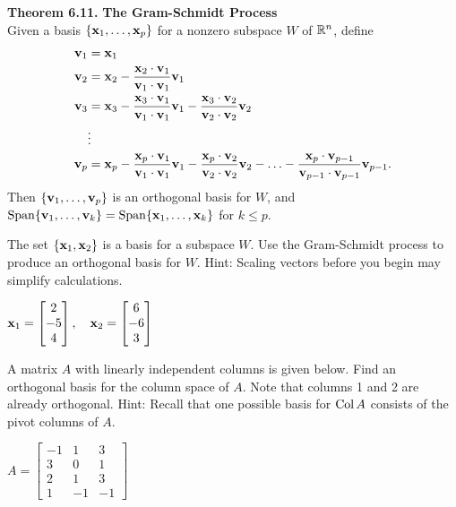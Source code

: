 \begin{boxthm}
	\textbf{Theorem 6.11.}
	\textbf{The Gram-Schmidt Process} \\
	Given a basis $\vectset[x]{1}{p}$ for a nonzero subspace $W$ of $\R^n$, define
	\vspace{-1ex}
	\begin{align*}
	\vect{v}_1 &= \vect{x}_1 \\
	\vect{v}_2 &= \vect{x}_2 - \frac{\vect{x}_2\cdot\vect{v}_1}{\vect{v}_1\cdot\vect{v}_1}\vect{v}_1 \\
	\vect{v}_3 &= \vect{x}_3 - \frac{\vect{x}_3\cdot\vect{v}_1}{\vect{v}_1\cdot\vect{v}_1}\vect{v}_1 - \frac{\vect{x}_3\cdot\vect{v}_2}{\vect{v}_2\cdot\vect{v}_2}\vect{v}_2 \\
	&\vdots \\
	\vect{v}_p &= \vect{x}_p - \frac{\vect{x}_p\cdot\vect{v}_1}{\vect{v}_1\cdot\vect{v}_1}\vect{v}_1 - \frac{\vect{x}_p\cdot\vect{v}_2}{\vect{v}_2\cdot\vect{v}_2}\vect{v}_2 - \ldots -  \frac{\vect{x}_p\cdot\vect{v}_{p-1}}{\vect{v}_{p-1}\cdot\vect{v}_{p-1}}\vect{v}_{p-1}.
	\end{align*}
	Then $\vectsetvp$ is an orthogonal basis for $W$, and $\Span\vectset{1}{k} = \Span\vectset[x]{1}{k}$ for $k\leq p$.
\end{boxthm}


\begin{exercise} %
	The set $\{\vect{x}_1,\vect{x}_2\}$ is a basis for a subspace $W$. Use the Gram-Schmidt process to produce an orthogonal basis for $W$. Hint: Scaling vectors before you begin may simplify calculations.
	
	\vspace{1em}
	$ \vect{x}_1 = \begin{bmatrix}2\\-5\\4\end{bmatrix}, \quad
	\vect{x}_2 = \begin{bmatrix}6\\-6\\3\end{bmatrix} $
\end{exercise}
\vfill


\begin{exercise} %
	A matrix $A$ with linearly independent columns is given below. Find an orthogonal basis for the column space of $A$. Note that columns 1 and 2 are already orthogonal. Hint: Recall that one possible basis for $\Col A$ consists of the pivot columns of $A$.
	
	\vspace{1em}
	$ A = \begin{bmatrix}-1&1&3\\3&0&1\\2&1&3\\1&-1&-1\end{bmatrix} $
\end{exercise}
\vfill


